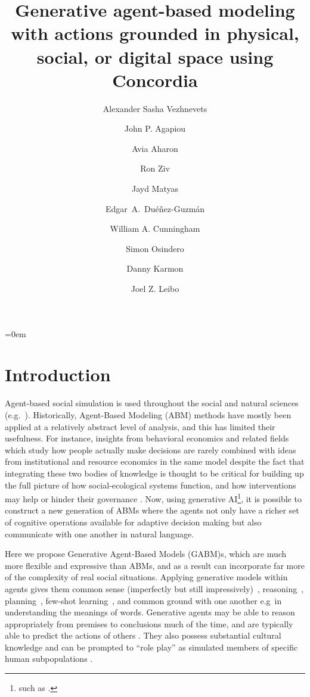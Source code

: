 \documentclass[11pt, a4paper, logo, twocolumn, internal, copyright, numbering]{googledeepmind}
\title{Generative agent-based modeling with actions grounded in physical, social, or digital space using Concordia}
\author[1]{Alexander Sasha Vezhnevets} \author[1]{John P. Agapiou} \author[2]{Avia Aharon} \author[2,4,$\dagger$]{Ron Ziv} \author[1]{Jayd Matyas} \author[1]{Edgar~A.~Du\'e\~nez-Guzm\'an} \author[3]{William A. Cunningham} \author[1]{Simon Osindero} \author[2]{Danny Karmon} \author[1]{Joel Z. Leibo}
\affil[1]{Google DeepMind}
\affil[2]{Google Research}
\affil[3]{University of Toronto}
\affil[4]{Technion - Israel Institute of Technology}
\begin{document}
\maketitle

{\onecolumn
{\parskip=0em
\tableofcontents}
}
\twocolumn

\section{Introduction}

Agent-based social simulation is used throughout the social and natural sciences (e.g.~\cite{poteete2010working}). Historically, Agent-Based Modeling (ABM) methods have mostly been applied at a relatively abstract level of analysis, and this has limited their usefulness. For instance, insights from behavioral economics and related fields which study how people actually make decisions are rarely combined with ideas from institutional and resource economics in the same model despite the fact that integrating these two bodies of knowledge is thought to be critical for building up the full picture of how social-ecological systems function, and how interventions may help or hinder their governance \citep{schill2019more}. Now, using generative AI\footnote{such as \cite{workshop2022bloom, openai2023gpt4, anil2023palm, touvron2023llama}.}, it is possible to construct a new generation of ABMs where the agents not only have a richer set of cognitive operations available for adaptive decision making but also communicate with one another in natural language. 

Here we propose Generative Agent-Based Models (GABM)s, which are much more flexible and expressive than ABMs, and as a result can incorporate far more of the complexity of real social situations. Applying generative models within agents gives them common sense (imperfectly but still impressively)~\citep{zhao2023large}, reasoning~\citep{huang2022inner, wei2022chain}, planning~\citep{song2023llm}, few-shot learning~\citep{brown2020language,bubeck2023sparks}, and common ground with one another e.g~in understanding the meanings of words. Generative agents may be able to reason appropriately from premises to conclusions much of the time, and are typically able to predict the actions of others \citep{aguera2023artificial, bubeck2023sparks}. They also possess substantial cultural knowledge and can be prompted to ``role play'' as simulated members of specific human subpopulations \citep{argyle2023out, shanahan2023role, safdari2023personality}.
\end{document}
